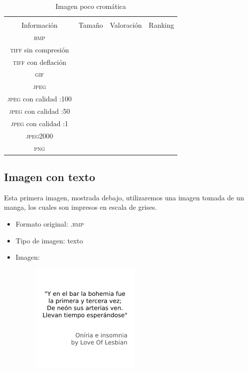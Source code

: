 \documentclass[11pt,a4paper]{article}
\begin{document}
\begin{table}[H]
\centering
\begin{tabular}{|c|c|c|c|}
\hline
\diagbox[width=15em]{\textit{Códec}/Formato}{\\Información} & Tamaño & Valoración & Ranking \\
\hline
\textsc{bmp} &  &  &  \\ \hline
\textsc{tiff} sin compresión &  &  &  \\ \hline
\textsc{tiff} con deflación &  &  &  \\ \hline
\textsc{gif} &  &  &  \\ \hline
\textsc{jpeg} &  &  &  \\ \hline
\textsc{jpeg} con calidad :100 &  &  &  \\ \hline
\textsc{jpeg} con calidad :50 &  &  &  \\ \hline
\textsc{jpeg} con calidad :1 &  &  &  \\ \hline
\textsc{jpeg2000} &  &  &  \\ \hline
\textsc{png} &  &  &  \\ \hline
\end{tabular}
\caption{Imagen poco cromática}
\label{tab:my-table}
\end{table}


\subsection{Imagen con texto}

Esta primera imagen, mostrada debajo, utilizaremos una imagen tomada de un manga, los cuales son impresos en escala de grises.

\begin{itemize}
	\item Formato original: \textsc{.bmp}
	\item Tipo de imagen: texto
	\item Imagen:
		\begin{figure}[H]
		\centering
			\includegraphics[width=0.5\textwidth]{Fotos/texto.bmp}
		\end{figure}	
\end{itemize}
\end{document}
